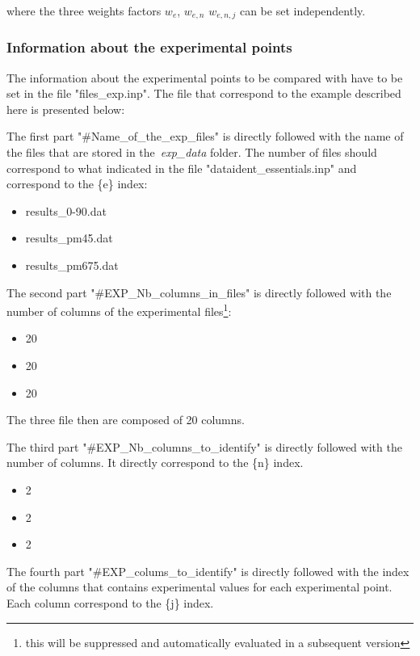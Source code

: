 \noindent where the three weights factors $w_{e}$, $w_{e,n}$ $w_{e,n,j}$ can be set independently.

\subsubsection{Information about the experimental points}

The information about the experimental points to be compared with have to be set in the file "files\_exp.inp". The file that correspond to the example described here is presented below:



The first part "\#Name\_of\_the\_exp\_files" is directly followed with the name of the files that are stored in the~\emph{exp\_data} folder. The number of files should correspond to what indicated in the file "data\/ident\_essentials.inp" and correspond to the \{e\} index:
\begin{itemize}
\item results\_0-90.dat
\item results\_pm45.dat
\item results\_pm675.dat
\end{itemize}

The second part "\#EXP\_Nb\_columns\_in\_files" is directly followed with the number of columns of the experimental files\footnote{this will be suppressed and automatically evaluated in a subsequent version}:
\begin{itemize}
\item 20
\item 20
\item 20
\end{itemize}

The three file then are composed of 20 columns.

The third part "\#EXP\_Nb\_columns\_to\_identify" is directly followed with the number of columns. It directly correspond to the \{n\} index.
\begin{itemize}
\item 2
\item 2
\item 2
\end{itemize}

The fourth part "\#EXP\_colums\_to\_identify" is directly followed with the index of the columns that contains experimental values for each experimental point. Each column correspond to the \{j\} index.

